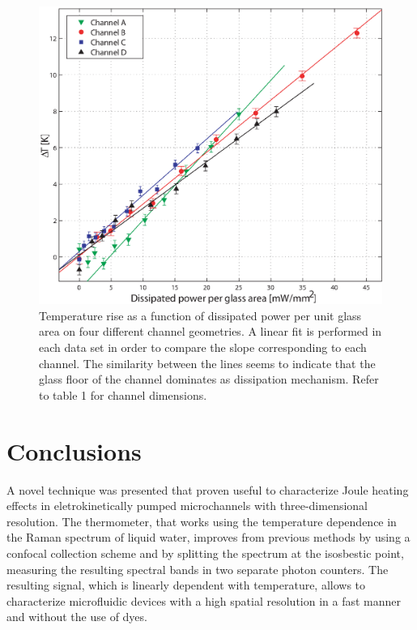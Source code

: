 \documentclass[9pt,twocolumn,twoside]{osajnl}
\begin{document}
\begin{figure}[htbp]
\centering
\includegraphics[width=\columnwidth]{figs/fig8.eps}
\caption{Temperature rise as a function of dissipated power per unit glass area on four different channel geometries. A linear fit is performed in each data set in order to compare the slope corresponding to each channel. The similarity between the lines seems to indicate that the glass floor of the channel dominates as dissipation mechanism. Refer to table 1 for channel dimensions.\label{fig:rectas}}
\end{figure}

\section{Conclusions}

A novel technique was presented that proven useful to characterize Joule heating effects in eletrokinetically pumped microchannels with three-dimensional resolution. The thermometer, that works using the temperature dependence in the Raman spectrum of liquid water, improves from previous methods by using a confocal collection scheme and by splitting the spectrum at the isosbestic point, measuring the resulting spectral bands in two separate photon counters. The resulting signal, which is linearly dependent with temperature, allows to characterize microfluidic devices with a high spatial resolution in a fast manner and without the use of dyes. 
\end{document}
